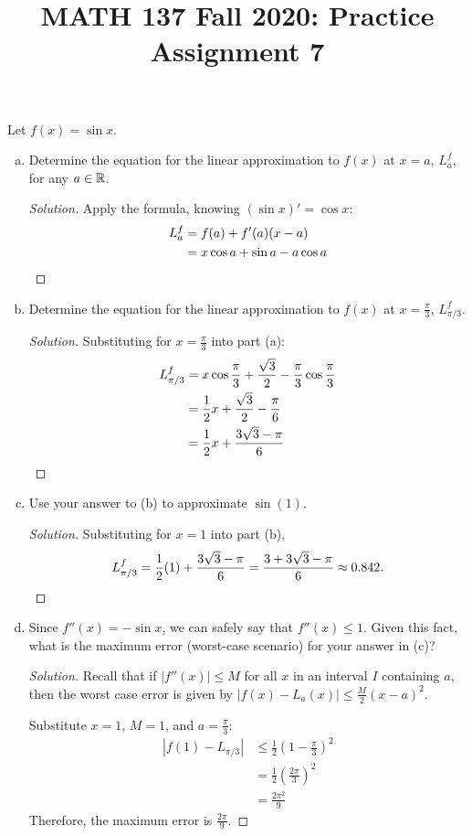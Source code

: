 
\title{MATH 137 Fall 2020: Practice Assignment 7}


\thispagestyle{firstpage}

\textbf{\@title}

\question Let $f(x)=\sin x$.
\begin{enumerate}[(a)]
  \item Determine the equation for the linear approximation to $f(x)$ at $x=a$, $L^f_a$, for any $a\in\mathbb{R}$.
        \begin{proof}[Solution]
          Apply the formula, knowing $(\sin x)' = \cos x$:
          \begin{align*}
            L^f_a & = f(a)+f'(a)(x-a)                     \\
                  & = x\cos a + \sin a - a\cos a \qedhere
          \end{align*}
        \end{proof}
  \item Determine the equation for the linear approximation to $f(x)$ at $x=\frac\pi3$, $L^f_{\pi/3}$.
        \begin{proof}[Solution]
          Substituting for $x=\frac\pi3$ into part (a):
          \begin{align*}
            L^f_{\pi/3} & = x\cos\frac\pi3 + \frac{\sqrt3}{2} - \frac\pi3\cos\frac\pi3 \\
                        & = \frac12x + \frac{\sqrt3}{2} - \frac\pi6                    \\
                        & = \frac12x + \frac{3\sqrt3 - \pi}{6} \qedhere
          \end{align*}
        \end{proof}
  \item Use your answer to (b) to approximate $\sin(1)$.
        \begin{proof}[Solution]
          Substituting for $x=1$ into part (b),
          \[ L^f_{\pi/3}=\frac12(1) + \frac{3\sqrt3 - \pi}{6} =\dfrac{3+3\sqrt3-\pi}{6} \approx 0.842. \qedhere \]
        \end{proof}
  \item Since $f''(x)=-\sin x$, we can safely say that $f''(x) \leq 1$.
        Given this fact, what is the maximum error (worst-case scenario) for your answer in (c)?
        \begin{proof}[Solution]
          Recall that if $|f''(x)| \leq M$ for all $x$ in an interval $I$ containing $a$,
          then the worst case error is given by $|f(x)-L_a(x)| \leq \frac{M}{2}(x-a)^2$.

          Substitute $x=1$, $M=1$, and $a=\frac\pi3$:
          \begin{align*}
            |f(1)-L_{\pi/3}| & \leq \frac12\left(1-\frac\pi3\right)^2 \\
                             & = \frac12\left(\frac{2\pi}{3}\right)^2 \\
                             & = \frac{2\pi^2}{9}
          \end{align*}
          Therefore, the maximum error is $\frac{2\pi}{9}$.
        \end{proof}
\end{enumerate}


